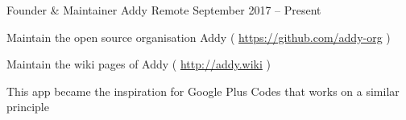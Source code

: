 \begin{cventries}
	\cventry
	{Founder \& Maintainer}
	{Addy}
	{Remote}
	{September 2017 – Present}
	{\begin{cvitems}
		\item {Maintain the open source organisation Addy ( \url{https://github.com/addy-org} )}
		\item {Maintain the wiki pages of Addy ( \url{http://addy.wiki} )}
		\item {This app became the inspiration for Google Plus Codes that works on a similar principle}
		\end{cvitems}}
		
    \cventry
    { }
    { }
    { }
    { }
    { }
\end{cventries}
